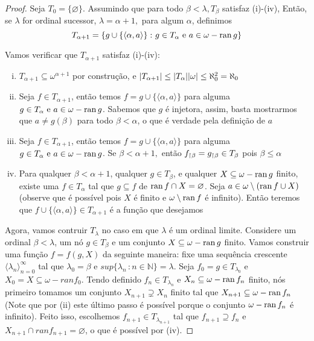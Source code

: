 \documentclass[a4paper]{article}
\begin{document}
\begin{proof}
    
    Seja \(T_0=\{\varnothing\}\). Assumindo que para todo \(\beta<\lambda, T_\beta\) satisfaz (i)-(iv), Então, se \(\lambda\) for ordinal sucessor, \(\lambda=\alpha+1,\) para algum \(\alpha\), definimos
    \[T_{\alpha+1}=\{g\cup\{\langle \alpha, a\rangle\}\,\colon g\in
    T_\alpha \text{ e } a\in \omega -\operatorname{ran} g\}\]
    
    Vamos verificar que \(T_{\alpha+1}\) satisfaz (i)-(iv):
    \begin{enumerate}[(i)]
      \item \(T_{\alpha+1}\subseteq\omega^{\alpha+1}\) por construção, e \(\vert T_{\alpha+1} \vert\leq\vert T_\alpha \vert\vert \omega \vert \le \aleph_0^2=\aleph_0\)
      \item Seja \(f\in T_{\alpha+1}\), então temos \(f=g\cup\{\langle\alpha,a\rangle\}\) para alguma \(g\in
    T_\alpha \text{ e } a\in \omega -\operatorname{ran} g\). Sabemos que \(g\) é injetora, assim, basta mostrarmos que \(a\neq g(\beta)\) para todo \(\beta<\alpha\), o que é verdade pela definição de \(a\)
      \item Seja \(f\in T_{\alpha+1}\), então temos \(f=g\cup\{\langle\alpha,a\rangle\}\) para alguma \(g\in
    T_\alpha \text{ e } a\in \omega -\operatorname{ran} g\). Se \(\beta<\alpha+1,\) então \(f_{\upharpoonright \beta}=g_{\upharpoonright \beta}\in T_\beta\) pois \(\beta\leq\alpha\)
      \item Para qualquer \(\beta < \alpha+1\), qualquer \(g \in T_{\beta}\), e
    qualquer \(X \subseteq \omega - \operatorname{ran} g\) finito, existe uma \(f \in
    T_{\alpha}\) tal que \(g \subseteq f\) de \(\operatorname{ran} f \cap X = \varnothing\). Seja \(a\in\omega\setminus(\operatorname{ran} f\cup X)\) (observe que é possível pois \(X\) é finito e \(\omega\setminus\operatorname{ran} f\) é infinito). Então teremos que \(f\cup\{\langle\alpha,a\rangle\}\in T_{\alpha+1}\) é a função que desejamos
    \end{enumerate}
      
   Agora, vamos contruir \(T_{\lambda}\) no caso em que \(\lambda\) é um ordinal
   limite. Considere um ordinal \(\beta< \lambda\), um nó \(g \in T_{\beta}\) e
   um conjunto \(X \subseteq \omega - \operatorname{ran} g\) finito. Vamos construir uma
   função \(f = f(g, X)\) da seguinte maneira: fixe uma sequência
   crescente \(\langle \lambda_n \rangle_{n=0}^{\infty}\) tal que \(\lambda_0  =\beta\)
   e \(sup\{\lambda_n\,\colon n \in \mathbb{N}\} = \lambda\). Seja
   \(f_0 = g \in T_{\lambda_0}\) e \(X_0 = X \subseteq \omega - ranf_0\). Tendo
   definido \(f_n \in T_{\lambda_n}\) e \(X_n\subseteq \omega - \operatorname{ran} f_n\)
   finito, nós primeiro tomamos um conjunto \(X_{n+1} \supsetneq X_n\) finito tal
   que \(X_{n+1} \subseteq \omega - \operatorname{ran} f_n\) (Note que por (ii) este último passo é
   possível porque o conjunto \(\omega -\operatorname{ran} f_n\) é infinito).
   Feito isso, escolhemos \(f_{n+1} \in T_{\lambda_{n+1}}\) tal que \(f_{n+1}
   \supseteq f_n\) e  \(X_{n+1} \cap ranf_{n+1} = \varnothing\), o que é possível
   por (iv).
   

\end{proof}
\end{document}
